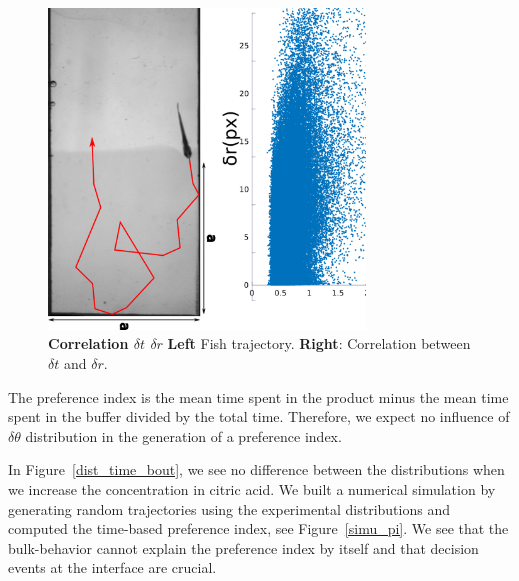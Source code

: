       \begin{figure}[h!]
        \centering
        \includegraphics[width=0.75\textwidth]{part_2/assets/random_dual.png}
        \caption{\textbf{Correlation $\delta t$ $\delta r$} \textbf{Left} Fish trajectory. \textbf{Right}: Correlation between $\delta t$ and $\delta r$.}
        \label{random_dual}
      \end{figure}

  The preference index is the mean time spent in the product minus the mean time spent in the buffer divided by the total time. Therefore, we expect no influence of $\delta \theta$ distribution in the generation of a preference index.

  In Figure~\ref{dist_time_bout}, we see no difference between the distributions when we increase the concentration in citric acid. We built a numerical simulation by generating random trajectories using the experimental distributions and computed the time-based preference index, see Figure~\ref{simu_pi}. We see that the bulk-behavior cannot explain the preference index by itself and that decision events at the interface are crucial.

